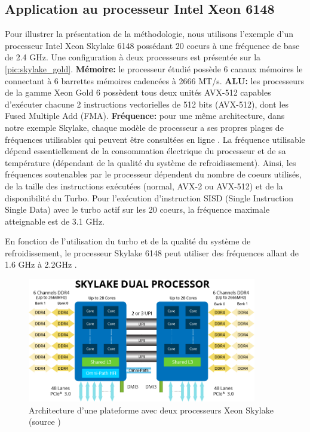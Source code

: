     

\subsection{Application au processeur Intel Xeon 6148}
    
    Pour illustrer la présentation de la méthodologie, nous utilisons l'exemple d'un processeur Intel Xeon Skylake 6148 possédant 20 coeurs à une fréquence de base de 2.4 GHz. Une configuration à deux processeurs est présentée sur la \autoref{pic:skylake_gold}. \textbf{Mémoire: } le processeur étudié possède 6 canaux mémoires le connectant à 6 barrettes mémoires cadencées à 2666 MT/s. \textbf{ALU:} les processeurs de la gamme Xeon Gold 6 possèdent tous deux unités AVX-512 capables d'exécuter chacune 2 instructions vectorielles de 512 bits (AVX-512), dont les Fused Multiple Add (FMA). \textbf{Fréquence:} pour une même architecture, dans notre exemple Skylake, chaque modèle de processeur a ses propres plages de fréquences utilisables qui peuvent être consultées en ligne \cite{Wikichipa}. La fréquence utilisable dépend essentiellement de la consommation électrique du processeur et de sa température (dépendant de la qualité du système de refroidissement). Ainsi, les fréquences soutenables par le processeur dépendent du nombre de coeurs utilisés, de la taille des instructions  exécutées (normal, AVX-2 ou AVX-512) et de la disponibilité du Turbo. Pour l'exécution d'instruction SISD (Single Instruction Single Data) avec le turbo actif sur les 20 coeurs, la fréquence maximale atteignable est de 3.1 GHz.  
    
    En fonction de l'utilisation du turbo et de la qualité du système de refroidissement, le processeur Skylake 6148 peut utiliser des fréquences allant de 1.6 GHz à 2.2GHz \cite{Wikichipa}. 
    
    \begin{figure}
        \center
        \includegraphics[width=10cm]{images/skylake_gold.png}
        \caption{\label{pic:skylake_gold} Architecture d'une plateforme avec deux processeurs Xeon Skylake (source \cite{Aspsys})}
    \end{figure}
    
